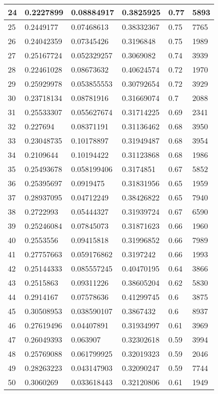 \begin{longtable}{|l|l|l|l|l|l|}
24 & 0.2227899 & 0.08884917 & 0.3825925 & 0.77 & 5893 \\ \hline 
25 & 0.2449177 & 0.07468613 & 0.38332367 & 0.75 & 7765 \\ \hline 
26 & 0.24042359 & 0.07345426 & 0.3196848 & 0.75 & 1989 \\ \hline 
27 & 0.25167724 & 0.052329257 & 0.3069082 & 0.74 & 3939 \\ \hline 
28 & 0.22461028 & 0.08673632 & 0.40624574 & 0.72 & 1970 \\ \hline 
29 & 0.25929978 & 0.053855553 & 0.30792654 & 0.72 & 3929 \\ \hline 
30 & 0.23718134 & 0.08781916 & 0.31669074 & 0.7 & 2088 \\ \hline 
31 & 0.25533307 & 0.055627674 & 0.31714225 & 0.69 & 2341 \\ \hline 
32 & 0.227694 & 0.08371191 & 0.31136462 & 0.68 & 3950 \\ \hline 
33 & 0.23048735 & 0.10178897 & 0.31949487 & 0.68 & 3954 \\ \hline 
34 & 0.2109644 & 0.10194422 & 0.31123868 & 0.68 & 1986 \\ \hline 
35 & 0.25493678 & 0.058199406 & 0.3174851 & 0.67 & 5852 \\ \hline 
36 & 0.25395697 & 0.0919475 & 0.31831956 & 0.65 & 1959 \\ \hline 
37 & 0.28937095 & 0.04712249 & 0.38426822 & 0.65 & 7940 \\ \hline 
38 & 0.2722993 & 0.05444327 & 0.31939724 & 0.67 & 6590 \\ \hline 
39 & 0.25246084 & 0.07845073 & 0.31871623 & 0.66 & 1960 \\ \hline 
40 & 0.2553556 & 0.09415818 & 0.31996852 & 0.66 & 7989 \\ \hline 
41 & 0.27757663 & 0.059176862 & 0.3197242 & 0.66 & 1993 \\ \hline 
42 & 0.25144333 & 0.085557245 & 0.40470195 & 0.64 & 3866 \\ \hline 
43 & 0.2515863 & 0.09311226 & 0.38605204 & 0.62 & 5830 \\ \hline 
44 & 0.2914167 & 0.07578636 & 0.41299745 & 0.6 & 3875 \\ \hline 
45 & 0.30508953 & 0.038590107 & 0.3867432 & 0.6 & 8937 \\ \hline 
46 & 0.27619496 & 0.04407891 & 0.31934997 & 0.61 & 3969 \\ \hline 
47 & 0.26049393 & 0.063907 & 0.32302618 & 0.59 & 3994 \\ \hline 
48 & 0.25769088 & 0.061799925 & 0.32019323 & 0.59 & 2046 \\ \hline 
49 & 0.28263223 & 0.043147903 & 0.32090247 & 0.59 & 7744 \\ \hline 
50 & 0.3060269 & 0.033618443 & 0.32120806 & 0.61 & 1949 \\ \hline 
\end{longtable}